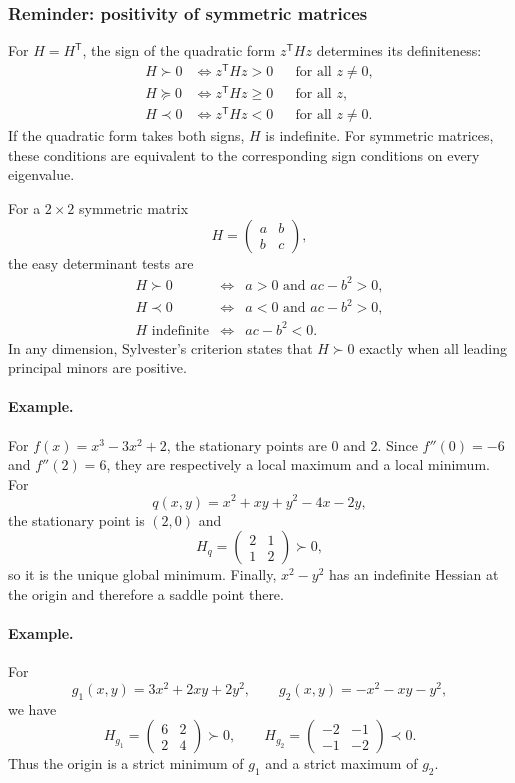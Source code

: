 \documentclass[11pt]{article}
\newcommand{\trans}{^{\mathsf T}}
\theoremstyle{definition}
\theoremstyle{remark}
\begin{document}
\subsubsection*{Reminder: positivity of symmetric matrices}

For $H=H\trans$, the sign of the quadratic form $z\trans Hz$ determines its
definiteness:
\[
\boxed{
\begin{aligned}
H\succ0&\Longleftrightarrow z\trans Hz>0 &&\text{for all }z\neq0,\\
H\succeq0&\Longleftrightarrow z\trans Hz\geq0 &&\text{for all }z,\\
H\prec0&\Longleftrightarrow z\trans Hz<0 &&\text{for all }z\neq0.
\end{aligned}}
\]
If the quadratic form takes both signs, $H$ is indefinite. For symmetric
matrices, these conditions are equivalent to the corresponding sign conditions
on every eigenvalue.

For a $2\times2$ symmetric matrix
\[
H=\begin{pmatrix}a&b\\b&c\end{pmatrix},
\]
the easy determinant tests are
\[
\boxed{
\begin{array}{rcl}
H\succ0&\Longleftrightarrow&a>0\text{ and }ac-b^2>0,\\
H\prec0&\Longleftrightarrow&a<0\text{ and }ac-b^2>0,\\
H\text{ indefinite}&\Longleftrightarrow&ac-b^2<0.
\end{array}}
\]
In any dimension, Sylvester's criterion states that $H\succ0$ exactly when
all leading principal minors are positive.

\paragraph{Example.}
For $f(x)=x^3-3x^2+2$, the stationary points are $0$ and $2$. Since
$f''(0)=-6$ and $f''(2)=6$, they are respectively a local maximum and a local
minimum. For
\[
q(x,y)=x^2+xy+y^2-4x-2y,
\]
the stationary point is $(2,0)$ and
\[
H_q=\begin{pmatrix}2&1\\1&2\end{pmatrix}\succ0,
\]
so it is the unique global minimum. Finally, $x^2-y^2$ has an indefinite
Hessian at the origin and therefore a saddle point there.

\paragraph{Example.}
For
\[
g_1(x,y)=3x^2+2xy+2y^2,
\qquad g_2(x,y)=-x^2-xy-y^2,
\]
we have
\[
H_{g_1}=\begin{pmatrix}6&2\\2&4\end{pmatrix}\succ0,
\qquad
H_{g_2}=\begin{pmatrix}-2&-1\\-1&-2\end{pmatrix}\prec0.
\]
Thus the origin is a strict minimum of $g_1$ and a strict maximum of $g_2$.
\end{document}
